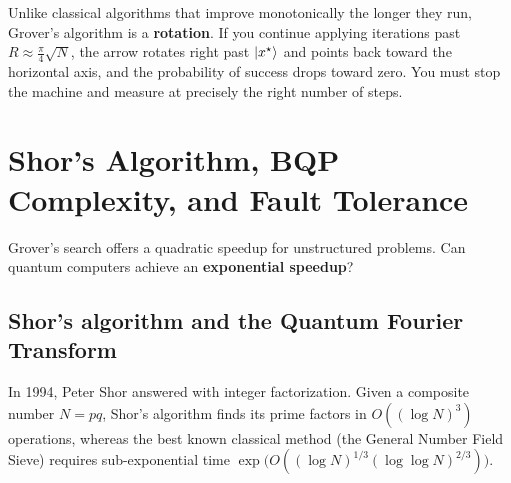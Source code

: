 \begin{trapbox}
Unlike classical algorithms that improve monotonically the longer they run, Grover's
algorithm is a \textbf{rotation}. If you continue applying iterations past
$R \approx \frac{\pi}{4}\sqrt{N}$, the arrow rotates right past $\lvert x^\star \rangle$ and
points back toward the horizontal axis, and the probability of success drops toward zero.
You must stop the machine and measure at precisely the right number of steps.
\end{trapbox}

\section{Shor's Algorithm, BQP Complexity, and Fault Tolerance}
\label{ch42:shor-bqp}

Grover's search offers a quadratic speedup for unstructured problems. Can quantum
computers achieve an \textbf{exponential speedup}?

\subsection{Shor's algorithm and the Quantum Fourier Transform}

In 1994, Peter Shor answered with integer factorization. Given a composite number
$N = pq$, Shor's algorithm finds its prime factors in $O((\log N)^3)$ operations,
whereas the best known classical method (the General Number Field Sieve) requires
sub-exponential time $\exp\bigl(O((\log N)^{1/3}(\log\log N)^{2/3})\bigr)$.


